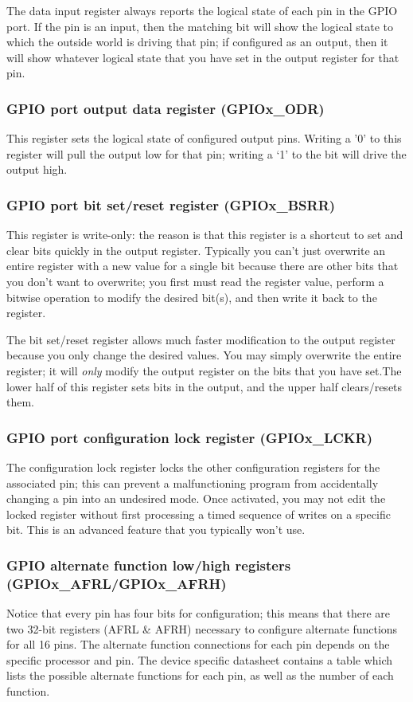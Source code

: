 \documentclass[openany,11pt,fleqn]{book} %
\begin{document}
The data input register always reports the logical state of each pin in the GPIO port. If the pin is an input, then the matching bit will show the logical state to which the outside world is driving that pin; if configured as an output, then it will show whatever logical state that you have set in the output register for that pin.

\subsubsection{GPIO port output data register (GPIOx\_ODR)}
This register sets the logical state of configured output pins. Writing a '0' to this register will pull the output low for that pin; writing a `1' to the bit will drive the output high.

\subsubsection{GPIO port bit set/reset register (GPIOx\_BSRR)}
This register is write-only: the reason is that this register is a shortcut to set and clear bits quickly in the output register. Typically you can't just overwrite an entire register with a new value for a single bit because there are other bits that you don't want to overwrite; you first must read the register value, perform a bitwise operation to modify the desired bit(s), and then write it back to the register.

The bit set/reset register allows much faster modification to the output register because you only change the desired values. You may simply overwrite the entire register; it will \textit{only} modify the output register on the bits that you have set.The lower half of this register sets bits in the output, and the upper half clears/resets them.

\subsubsection{GPIO port configuration lock register (GPIOx\_LCKR)}
The configuration lock register locks the other configuration registers for the associated pin; this can prevent a malfunctioning program from accidentally changing a pin into an undesired mode. Once activated, you may not edit the locked register without first processing a timed sequence of writes on a specific bit. This is an advanced feature that you typically won't use.

\subsubsection{GPIO alternate function low/high registers (GPIOx\_AFRL/GPIOx\_AFRH)}
Notice that every pin has four bits for configuration; this means that there are two 32-bit registers (AFRL \& AFRH) necessary to configure alternate functions for all 16 pins. The alternate function connections for each pin depends on the specific processor and pin. The device specific datasheet contains a table which lists the possible alternate functions for each pin, as well as the number of each function.
\end{document}
